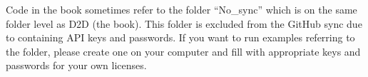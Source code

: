 \documentclass[letterpaper,10pt,english]{jupyterBook}
\begin{document}
\begin{DUlineblock}{0em}
\item[] 
\end{DUlineblock}

\begin{DUlineblock}{0em}
\item[] 
\end{DUlineblock}

\sphinxAtStartPar
Code in the book sometimes refer to the folder “No\_sync” which is on the same folder level as D2D (the book). This folder is excluded from the GitHub sync due to containing API keys and passwords. If you want to run examples referring to the folder, please create one on your computer and fill with appropriate keys and passwords for your own licenses.
\end{document}
